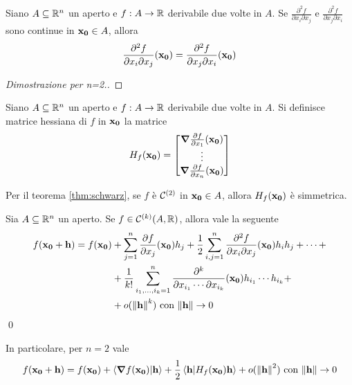 \begin{theorem}
    [di Schwarz]\label{thm:schwarz}
    Siano $A \subseteq \mathbb{R}^n$ un aperto e $f: A \to \mathbb{R}$ derivabile due volte in $A$. Se $\frac{\partial ^2 f}{\partial x_i \partial x_j}$ e $\frac{\partial^2 f}{\partial x_j \partial x_i}$ sono continue in $\vb{x_0} \in A$, allora
    $$
        \frac{\partial ^2 f}{\partial x_i \partial x_j}(\vb{x_0}) = \frac{\partial^2  f}{\partial x_j \partial x_i}(\vb{x_0})
    $$
\end{theorem}

\begin{proof}
    [Dimostrazione per n=2.] %
\end{proof}

\begin{definition}
    Siano $A \subseteq \mathbb{R}^n$ un aperto e $f: A \to \mathbb{R}$ derivabile due volte in $A$. Si definisce matrice hessiana di $f$ in $\vb{x_0}$ la matrice
    $$
        H_f(\vb{x_0}) =
        \begin{bmatrix}
            \grad \frac{\partial f}{\partial x_1}(\vb{x_0})\\
            \vdots\\
            \grad \frac{\partial f}{\partial x_n}(\vb{x_0})
        \end{bmatrix}
    $$
\end{definition}

\begin{remark}
    Per il teorema \ref{thm:schwarz}, se $f$ è $\mathcal{C}^{(2)}$ in $\vb{x_0} \in A$, allora $H_f(\vb{x_0})$ è simmetrica.
\end{remark}

\begin{theorem}
    Sia $A \subseteq \mathbb{R}^n$ un aperto. Se $f \in \mathcal{C}^{(k)}(A, \mathbb{R})$, allora vale la seguente
    \begin{align*}
        f(\vb{x_0}+ \vb{h})= f(\vb{x_0})&+\sum_{j=1}^{n}\frac{\partial f}{\partial x_j}(\vb{x_0})h_j + \frac{1}{2}\sum_{i,j=1}^{n}\frac{\partial^2 f}{\partial x_i \partial x_j}(\vb{x_0})h_ih_j+\cdots+\\
        &+\frac{1}{k!}\sum_{i_1,\dots,i_k=1}^n\frac{\partial^k}{\partial x_{i_1}\cdots\partial x_{i_k}}(\vb{x_0})h_{i_1}\cdots h_{i_k} +\\
        &+o (\norm{\vb{h}}^k) \text{ con } \norm{\vb{h}} \to 0
    \end{align*}
    \qed
\end{theorem}

\begin{remark}
    In particolare, per $n=2$ vale
    $$
        f(\vb{x_0} + \vb{h}) = f(\vb{x_0})+\innerproduct{\grad f(\vb{x_0})}{\vb{h}} + \frac{1}{2}\innerproduct{\vb{h}}{H_f(\vb{x_0})\vb{h}}+o(\norm{\vb{h}}^2) \with \norm{\vb{h}} \to 0
    $$
\end{remark}

